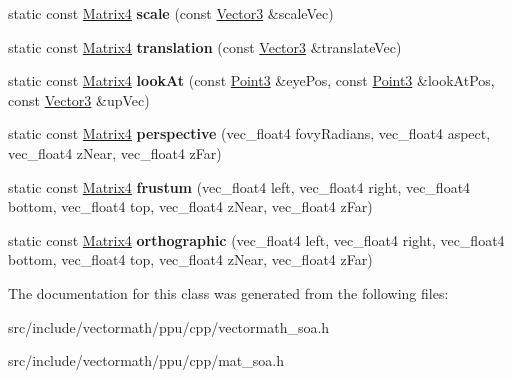 \begin{DoxyCompactItemize}
\item 
\hypertarget{classVectormath_1_1Soa_1_1Matrix4_a11f77bd52610acc1e711a083393a846f}{static const \hyperlink{classVectormath_1_1Soa_1_1Matrix4}{Matrix4} {\bfseries scale} (const \hyperlink{classVectormath_1_1Soa_1_1Vector3}{Vector3} \&scale\-Vec)}\label{classVectormath_1_1Soa_1_1Matrix4_a11f77bd52610acc1e711a083393a846f}

\item 
\hypertarget{classVectormath_1_1Soa_1_1Matrix4_a10f9a46a37ce7fdfe3b855e37f0e5de3}{static const \hyperlink{classVectormath_1_1Soa_1_1Matrix4}{Matrix4} {\bfseries translation} (const \hyperlink{classVectormath_1_1Soa_1_1Vector3}{Vector3} \&translate\-Vec)}\label{classVectormath_1_1Soa_1_1Matrix4_a10f9a46a37ce7fdfe3b855e37f0e5de3}

\item 
\hypertarget{classVectormath_1_1Soa_1_1Matrix4_aebac61852819566ddf01eab93e0cfd36}{static const \hyperlink{classVectormath_1_1Soa_1_1Matrix4}{Matrix4} {\bfseries look\-At} (const \hyperlink{classVectormath_1_1Soa_1_1Point3}{Point3} \&eye\-Pos, const \hyperlink{classVectormath_1_1Soa_1_1Point3}{Point3} \&look\-At\-Pos, const \hyperlink{classVectormath_1_1Soa_1_1Vector3}{Vector3} \&up\-Vec)}\label{classVectormath_1_1Soa_1_1Matrix4_aebac61852819566ddf01eab93e0cfd36}

\item 
\hypertarget{classVectormath_1_1Soa_1_1Matrix4_a80039d3399157c8169c7ccd45bf8a440}{static const \hyperlink{classVectormath_1_1Soa_1_1Matrix4}{Matrix4} {\bfseries perspective} (vec\-\_\-float4 fovy\-Radians, vec\-\_\-float4 aspect, vec\-\_\-float4 z\-Near, vec\-\_\-float4 z\-Far)}\label{classVectormath_1_1Soa_1_1Matrix4_a80039d3399157c8169c7ccd45bf8a440}

\item 
\hypertarget{classVectormath_1_1Soa_1_1Matrix4_a28bcc3fc31932d7fc2aaaef6ad8c96cc}{static const \hyperlink{classVectormath_1_1Soa_1_1Matrix4}{Matrix4} {\bfseries frustum} (vec\-\_\-float4 left, vec\-\_\-float4 right, vec\-\_\-float4 bottom, vec\-\_\-float4 top, vec\-\_\-float4 z\-Near, vec\-\_\-float4 z\-Far)}\label{classVectormath_1_1Soa_1_1Matrix4_a28bcc3fc31932d7fc2aaaef6ad8c96cc}

\item 
\hypertarget{classVectormath_1_1Soa_1_1Matrix4_aafb9e2c427c8e4c927478cbc0e58da3c}{static const \hyperlink{classVectormath_1_1Soa_1_1Matrix4}{Matrix4} {\bfseries orthographic} (vec\-\_\-float4 left, vec\-\_\-float4 right, vec\-\_\-float4 bottom, vec\-\_\-float4 top, vec\-\_\-float4 z\-Near, vec\-\_\-float4 z\-Far)}\label{classVectormath_1_1Soa_1_1Matrix4_aafb9e2c427c8e4c927478cbc0e58da3c}

\end{DoxyCompactItemize}


The documentation for this class was generated from the following files\-:\begin{DoxyCompactItemize}
\item 
src/include/vectormath/ppu/cpp/vectormath\-\_\-soa.\-h\item 
src/include/vectormath/ppu/cpp/mat\-\_\-soa.\-h\end{DoxyCompactItemize}
